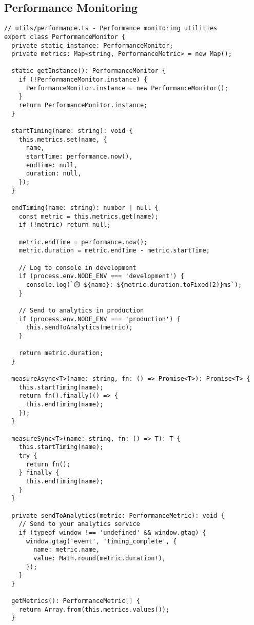 \documentclass[11pt,a4paper]{article}
\begin{document}
\subsection{Performance Monitoring}

\begin{lstlisting}[style=typescript, caption=Performance Monitoring Implementation]
// utils/performance.ts - Performance monitoring utilities
export class PerformanceMonitor {
  private static instance: PerformanceMonitor;
  private metrics: Map<string, PerformanceMetric> = new Map();
  
  static getInstance(): PerformanceMonitor {
    if (!PerformanceMonitor.instance) {
      PerformanceMonitor.instance = new PerformanceMonitor();
    }
    return PerformanceMonitor.instance;
  }
  
  startTiming(name: string): void {
    this.metrics.set(name, {
      name,
      startTime: performance.now(),
      endTime: null,
      duration: null,
    });
  }
  
  endTiming(name: string): number | null {
    const metric = this.metrics.get(name);
    if (!metric) return null;
    
    metric.endTime = performance.now();
    metric.duration = metric.endTime - metric.startTime;
    
    // Log to console in development
    if (process.env.NODE_ENV === 'development') {
      console.log(`⏱️ ${name}: ${metric.duration.toFixed(2)}ms`);
    }
    
    // Send to analytics in production
    if (process.env.NODE_ENV === 'production') {
      this.sendToAnalytics(metric);
    }
    
    return metric.duration;
  }
  
  measureAsync<T>(name: string, fn: () => Promise<T>): Promise<T> {
    this.startTiming(name);
    return fn().finally(() => {
      this.endTiming(name);
    });
  }
  
  measureSync<T>(name: string, fn: () => T): T {
    this.startTiming(name);
    try {
      return fn();
    } finally {
      this.endTiming(name);
    }
  }
  
  private sendToAnalytics(metric: PerformanceMetric): void {
    // Send to your analytics service
    if (typeof window !== 'undefined' && window.gtag) {
      window.gtag('event', 'timing_complete', {
        name: metric.name,
        value: Math.round(metric.duration!),
      });
    }
  }
  
  getMetrics(): PerformanceMetric[] {
    return Array.from(this.metrics.values());
  }
  

\end{lstlisting}
\end{document}
